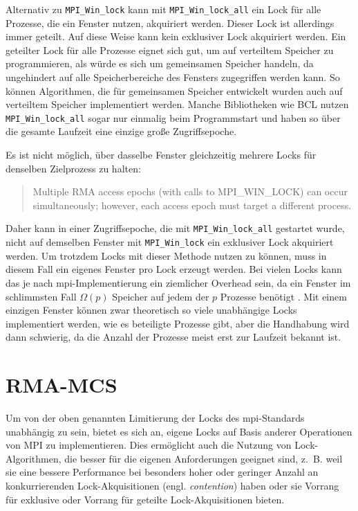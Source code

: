 Alternativ zu \texttt{MPI\_Win\_lock} kann mit \texttt{MPI\_Win\_lock\_all} ein Lock für alle Prozesse,
die ein \gls{Fenster} nutzen,
akquiriert werden.
Dieser Lock ist allerdings immer geteilt.
Auf diese Weise kann kein exklusiver Lock akquiriert werden.
Ein geteilter Lock für alle Prozesse eignet sich gut,
um auf verteiltem Speicher zu programmieren,
als würde es sich um gemeinsamen Speicher handeln,
da ungehindert auf alle Speicherbereiche des \gls{Fenster}s zugegriffen werden kann.
So können Algorithmen,
die für gemeinsamen Speicher entwickelt wurden
auch auf verteiltem Speicher implementiert werden.
Manche Bibliotheken wie BCL \cite{BCL} nutzen \texttt{MPI\_Win\_lock\_all} sogar nur einmalig beim Programmstart
und haben so über die gesamte Laufzeit eine einzige große Zugriffsepoche.

Es ist nicht möglich,
über dasselbe \gls{Fenster} gleichzeitig mehrere Locks für denselben Zielprozess zu halten:
\foreignblockcquote{english}[Kapitel 11.5.3, S. 446]{MPI-3.1}{%
    Multiple RMA access epochs (with calls
    to MPI\_WIN\_LOCK) can occur simultaneously; however, each access epoch must target a
    different process.}
Daher kann in einer Zugriffsepoche,
die mit \texttt{MPI\_Win\_lock\_all} gestartet wurde,
nicht auf demselben \gls{Fenster} mit \texttt{MPI\_Win\_lock} ein exklusiver Lock akquiriert werden.
Um trotzdem Locks mit dieser Methode nutzen zu können,
muss in diesem Fall ein eigenes \gls{Fenster} pro Lock erzeugt werden.
Bei vielen Locks kann das je nach \gls{mpi}-Implementierung ein ziemlicher Overhead sein,
da ein \gls{Fenster} im schlimmsten Fall $\Omega(p)$ Speicher auf jedem der $p$ Prozesse benötigt \cite{foMPI}.
Mit einem einzigen \gls{Fenster} können zwar theoretisch so viele unabhängige Locks implementiert werden,
wie es beteiligte Prozesse gibt,
aber die Handhabung wird dann schwierig,
da die Anzahl der Prozesse meist erst zur Laufzeit bekannt ist.

\section{RMA-MCS}
\label{sec:rma-mcs}

Um von der oben genannten Limitierung der Locks des \gls{mpi}-Standards unabhängig zu sein,
bietet es sich an,
eigene Locks auf Basis anderer Operationen von MPI zu implementieren.
Dies ermöglicht auch die Nutzung von Lock-Algorithmen,
die besser für die eigenen Anforderungen geeignet sind,
z.~B. weil sie eine bessere Performance bei besonders hoher oder geringer Anzahl an konkurrierenden Lock-Akquisitionen (engl. \textit{contention}) haben
oder sie Vorrang für exklusive oder Vorrang für geteilte Lock-Akquisitionen bieten.

